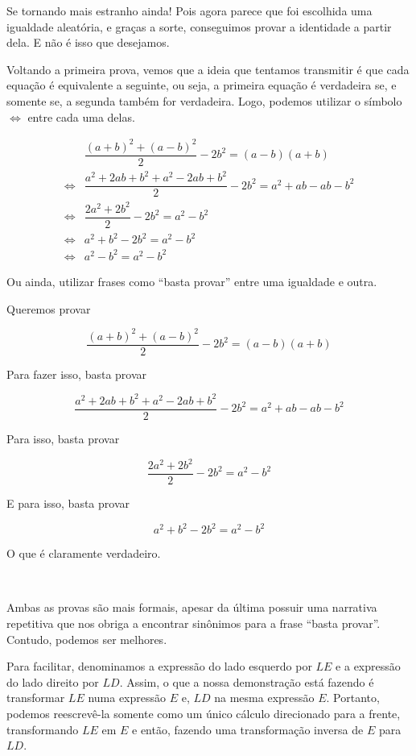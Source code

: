   Se tornando mais estranho ainda! Pois agora parece que foi escolhida uma igualdade aleatória, e graças a sorte, conseguimos provar a identidade a partir dela. E não é isso que desejamos.

  Voltando a primeira prova, vemos que a ideia que tentamos transmitir é que cada equação é equivalente a seguinte, ou seja, a primeira equação é verdadeira se, e somente se, a segunda também for verdadeira. Logo, podemos utilizar o símbolo $\iff$ entre cada uma delas.

  \begin{equation*}
    \begin{aligned}
      &\dfrac{(a+b)^2+(a-b)^2}{2}-2b^2 = (a-b)(a+b)\\
      \iff &\dfrac{a^2+2ab+b^2+a^2-2ab+b^2}{2}-2b^2 = a^2+ab-ab-b^2\\
      \iff &\dfrac{2a^2+2b^2}{2}-2b^2 = a^2-b^2\\
      \iff &a^2+b^2-2b^2 = a^2-b^2\\
      \iff &a^2-b^2 = a^2-b^2
    \end{aligned}
  \end{equation*}

  Ou ainda, utilizar frases como ``basta provar'' entre uma igualdade e outra.

  Queremos provar

  \[\dfrac{(a+b)^2+(a-b)^2}{2}-2b^2 = (a-b)(a+b)\]

  Para fazer isso, basta provar

  \[\dfrac{a^2+2ab+b^2+a^2-2ab+b^2}{2}-2b^2 = a^2+ab-ab-b^2\]

  Para isso, basta provar

  \[\dfrac{2a^2+2b^2}{2}-2b^2 = a^2-b^2\]

  E para isso, basta provar

  \[a^2+b^2-2b^2 = a^2-b^2\]
  
  O que é claramente verdadeiro.
  
  $\qquad$

  Ambas as provas são mais formais, apesar da última possuir uma narrativa repetitiva que nos obriga a encontrar sinônimos para a frase ``basta provar''. Contudo, podemos ser melhores.
  
  Para facilitar, denominamos a expressão do lado esquerdo por $LE$ e a expressão do lado direito por $LD$. Assim, o que a nossa demonstração está fazendo é transformar $LE$ numa expressão $E$ e, $LD$ na mesma expressão $E$.
  Portanto, podemos reescrevê-la somente como um único cálculo direcionado para a frente, transformando $LE$ em $E$ e então, fazendo uma transformação inversa de $E$ para $LD$.

